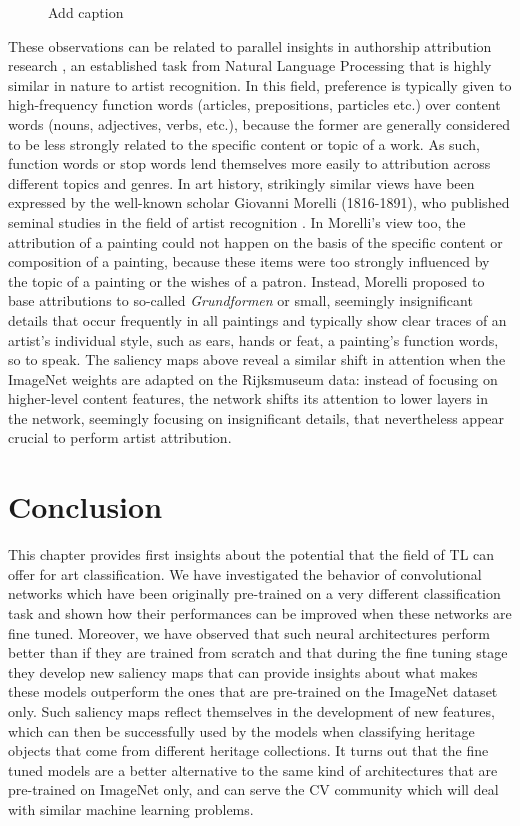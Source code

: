 \begin{figure}[!htb]
\endminipage

\caption{Add caption}
\label{fig:saliency_maps}
\end{figure}


These observations can be related to parallel insights in authorship attribution research \cite{stamatatos:2009}, an established task from Natural Language Processing that is highly similar in nature to artist recognition. In this field, preference is typically given to high-frequency function words (articles, prepositions, particles etc.) over content words (nouns, adjectives, verbs, etc.), because the former are generally considered to be less strongly related to the specific content or topic of a work. As such, function words or stop words lend themselves more easily to attribution across different topics and genres. In art history, strikingly similar views have been expressed by the well-known scholar Giovanni Morelli (1816-1891), who published seminal studies in the field of artist recognition \cite{wollheim:1972}. In Morelli's view too, the attribution of a painting could not happen on the basis of the specific content or composition of a painting, because these items were too strongly influenced by the topic of a painting or the wishes of a patron. Instead, Morelli proposed to base attributions to so-called \emph{Grundformen} or small, seemingly insignificant details that occur frequently in all paintings and typically show clear traces of an artist's individual style, such as ears, hands or feat, a painting's function words, so to speak. The saliency maps above reveal a similar shift in attention when the ImageNet weights are adapted on the Rijksmuseum data: instead of focusing on higher-level content features, the network shifts its attention to lower layers in the network, seemingly focusing on insignificant details, that nevertheless appear crucial to perform artist attribution.


\section{Conclusion} 
\label{sec:ch_4_conclusion}
 
This chapter provides first insights about the potential that the field of TL can offer for art classification. We have investigated the behavior of convolutional networks which have been originally pre-trained on a very different classification task and shown how their performances can be improved when these networks are fine tuned. Moreover, we have observed that such neural architectures perform better than if they are trained from scratch and that during the fine tuning stage they develop new saliency maps that can provide insights about what makes these models outperform the ones that are pre-trained on the ImageNet dataset only. Such saliency maps reflect themselves in the development of new features, which can then be successfully used by the models when classifying heritage objects that come from different heritage collections. It turns out that the fine tuned models are a better alternative to the same kind of architectures that are pre-trained on ImageNet only, and can serve the CV community which will deal with similar machine learning problems.

